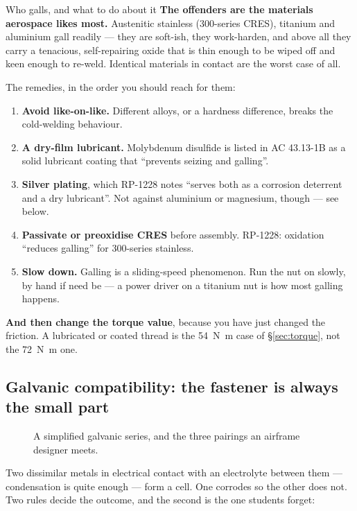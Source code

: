 \documentclass[11pt,a4paper]{article}
\begin{document}
\begin{keybox}{Who galls, and what to do about it}
\textbf{The offenders are the materials aerospace likes most.} Austenitic stainless (300-series
CRES), titanium and aluminium gall readily --- they are soft-ish, they work-harden, and above all
they carry a tenacious, self-repairing oxide that is thin enough to be wiped off and keen enough to
re-weld. Identical materials in contact are the worst case of all.

\medskip
The remedies, in the order you should reach for them:
\begin{enumerate}[leftmargin=*,itemsep=1pt]
\item \textbf{Avoid like-on-like.} Different alloys, or a hardness difference, breaks the
  cold-welding behaviour.
\item \textbf{A dry-film lubricant.} Molybdenum disulfide is listed in AC 43.13-1B as a solid
  lubricant coating that ``prevents seizing and galling''.
\item \textbf{Silver plating}, which RP-1228 notes ``serves both as a corrosion deterrent and a dry
  lubricant''. Not against aluminium or magnesium, though --- see below.
\item \textbf{Passivate or preoxidise CRES} before assembly. RP-1228: oxidation ``reduces galling''
  for 300-series stainless.
\item \textbf{Slow down.} Galling is a sliding-speed phenomenon. Run the nut on slowly, by hand if
  need be --- a power driver on a titanium nut is how most galling happens.
\end{enumerate}

\medskip
\textbf{And then change the torque value}, because you have just changed the friction. A lubricated
or coated thread is the \SI{54}{N.m} case of \S\ref{sec:torque}, not the \SI{72}{N.m} one.
\end{keybox}

\subsection{Galvanic compatibility: the fastener is always the small part}

\begin{figure}[H]\centering
\resizebox{0.95\textwidth}{!}{}
\caption{A simplified galvanic series, and the three pairings an airframe designer meets.}
\label{fig:galvanic}
\end{figure}

Two dissimilar metals in electrical contact with an electrolyte between them --- condensation is
quite enough --- form a cell. One corrodes so the other does not. Two rules decide the outcome, and
the second is the one students forget:
\end{document}
